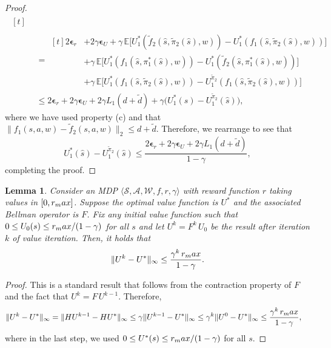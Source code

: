 \documentclass[11pt, notitlepage]{article}
\newcommand{\E}{\mathbb{E}}
\newcommand{\1}{\mathbbm{1}}
\newtheorem{lemma}{Lemma}[section]
\begin{document}
\begin{proof}
\begin{equation*}
\begin{aligned}
\begin{aligned}[t]
        \end{aligned}\\
        &= \begin{aligned}[t] 2 \boldsymbol{\epsilon}_r &+ 2\gamma \boldsymbol{\epsilon}_U + \gamma\, \E \bigl [ U_1^*(\tilde{f}_2(\hat{s},\tilde{\pi}_2(\hat{s}),w)) - U_1^*(f_1(\hat{s},\tilde{\pi}_2(\hat{s}),w)) \bigr ]\\
        &+ \gamma \, \E \bigl[ U_1^*(f_1(\hat{s},\pi_1^*(\hat{s}),w)) -U_1^*(\tilde{f}_2(\hat{s},\pi_1^*(\hat{s}),w)) \bigr]\\
        &+ \gamma \, \E \bigl[ U_1^*(f_1(\hat{s},\tilde{\pi}_2(\hat{s}),w)) - U_1^{\tilde{\pi}_2}(f_1(\hat{s},\tilde{\pi}_2(\hat{s}),w)) \bigr]
        \end{aligned}\\
        &\leq 2\boldsymbol{\epsilon}_r + 2\gamma\boldsymbol{\epsilon}_U + 2\gamma L_1 (d+\tilde{d}) + \gamma \bigl(U_1^*(\hat{s}) - U_1^{\tilde{\pi}_2}(\hat{s}) \bigr),
        \end{aligned}
    \end{equation*}
    where we have used property (c) and that $\|f_1(s, a, w) - \tilde{f}_2(s,a,w)\|_2 \le d + \tilde{d}$.
    Therefore, we rearrange to see that
    \begin{equation*}
        U_1^*(\hat{s}) - U_1^{\tilde{\pi}_2}(\hat{s}) \leq \frac{2\boldsymbol{\epsilon}_r + 2\gamma\boldsymbol{\epsilon}_U + 2\gamma L_1 (d+\tilde{d})}{1-\gamma},
    \end{equation*}
    completing the proof.
\end{proof}



\begin{lemma}
    \label{lemma:Uk_Uopt}
    Consider an MDP $\langle \mathcal{S}, \mathcal{A}, \mathcal{W}, f, r, \gamma \rangle$ with reward function $r$ taking values in $[0, r_\textnormal{max}]$. Suppose the optimal value function is $U^*$ and the associated Bellman operator is $F$. Fix any initial value function such that $0\le U_0(s) \le r_\textnormal{max}/(1-\gamma)$ for all $s$ and let $U^k = F^k \, U_0$ be the result after iteration $k$ of value iteration. Then, it holds that
    \begin{equation*}
        \|U^k - U^*\|_\infty \leq \frac{ \gamma^k \, r_\textnormal{max}}{1-\gamma}.
    \end{equation*}
\end{lemma}

\begin{proof}
    This is a standard result that follows from the contraction property of $F$ and the fact that $U^k = F \, U^{k-1}$. Therefore,
    \begin{align*}
        \|U^k - U^*\|_\infty 
        = \|HU^{k-1} - HU^*\|_\infty &\leq \gamma\|U^{k-1} - U^*\|_\infty \leq \gamma^k \|U^0 - U^*\|_\infty \leq \frac{\gamma^k \, r_\textnormal{max}}{1-\gamma},
    \end{align*}
    where in the last step, we used $0 \le U^*(s) \le r_\textnormal{max}/(1-\gamma)$ for all $s$.
\end{proof}
\end{document}
